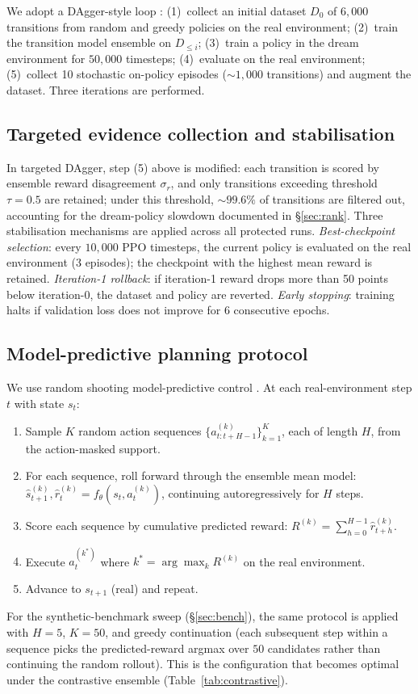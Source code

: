 \documentclass[11pt]{article}
\begin{document}
We adopt a DAgger-style loop \citep{ross2011reduction}: (1)~collect an initial dataset $D_0$ of $6{,}000$ transitions from random and greedy policies on the real environment; (2)~train the transition model ensemble on $D_{\leq i}$; (3)~train a policy in the dream environment for $50{,}000$ timesteps; (4)~evaluate on the real environment; (5)~collect 10 stochastic on-policy episodes ($\sim$$1{,}000$ transitions) and augment the dataset. Three iterations are performed.

\subsection*{Targeted evidence collection and stabilisation}

In targeted DAgger, step (5) above is modified: each transition is scored by ensemble reward disagreement $\sigma_r$, and only transitions exceeding threshold $\tau = 0.5$ are retained; under this threshold, $\sim$$99.6\%$ of transitions are filtered out, accounting for the dream-policy slowdown documented in \S\ref{sec:rank}. Three stabilisation mechanisms are applied across all protected runs. \emph{Best-checkpoint selection}: every $10{,}000$ PPO timesteps, the current policy is evaluated on the real environment (3 episodes); the checkpoint with the highest mean reward is retained. \emph{Iteration-1 rollback}: if iteration-1 reward drops more than 50 points below iteration-0, the dataset and policy are reverted. \emph{Early stopping}: training halts if validation loss does not improve for 6 consecutive epochs.

\subsection*{Model-predictive planning protocol}\label{sec:methods-mpc}

We use random shooting model-predictive control \citep{garcia1989model,williams2017model,rubinstein1999cross}. At each real-environment step $t$ with state $s_t$:
\begin{enumerate}
\item Sample $K$ random action sequences $\{a^{(k)}_{t:t+H-1}\}_{k=1}^K$, each of length $H$, from the action-masked support.
\item For each sequence, roll forward through the ensemble mean model: $\hat{s}^{(k)}_{t+1}, \hat{r}^{(k)}_t = f_\theta(s_t, a^{(k)}_t)$, continuing autoregressively for $H$ steps.
\item Score each sequence by cumulative predicted reward: $R^{(k)} = \sum_{h=0}^{H-1} \hat{r}^{(k)}_{t+h}$.
\item Execute $a^{(k^*)}_{t}$ where $k^* = \arg\max_k R^{(k)}$ on the real environment.
\item Advance to $s_{t+1}$ (real) and repeat.
\end{enumerate}
For the synthetic-benchmark sweep (\S\ref{sec:bench}), the same protocol is applied with $H{=}5$, $K{=}50$, and greedy continuation (each subsequent step within a sequence picks the predicted-reward argmax over $50$ candidates rather than continuing the random rollout). This is the configuration that becomes optimal under the contrastive ensemble (Table~\ref{tab:contrastive}).
\end{document}
